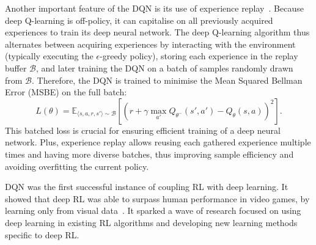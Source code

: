 Another important feature of the DQN is its use of experience replay~\citep{Lin1992_ExperienceReplay}. Because deep Q-learning is off-policy, it can capitalise on all previously acquired experiences to train its deep neural network. The deep Q-learning algorithm thus alternates between acquiring experiences by interacting with the environment (typically executing the $\epsilon$-greedy policy), storing each experience in the replay buffer $\mathcal{B}$, and later training the DQN on a batch of samples randomly drawn from $\mathcal{B}$. Therefore, the DQN is trained to minimise the Mean Squared Bellman Error (MSBE) on the full batch:
\begin{equation}
    L(\theta)=\mathbb{E}_{\langle s,a,r,s'\rangle\sim\mathcal{B}}\left[\left(r+\gamma\max_{a'}Q_{{\theta^-}}(s',a')-Q_\theta(s,a)\right)^2\right].
    \label{eq:DQN}
\end{equation}
This batched loss is crucial for ensuring efficient training of a deep neural network. Plus, experience replay allows reusing each gathered experience multiple times and having more diverse batches, thus improving sample efficiency and avoiding overfitting the current policy.

DQN was the first successful instance of coupling RL with deep learning. It showed that deep RL was able to surpass human performance in video games, by learning only from visual data~\citep{Mnih2013_DQN}. It sparked a wave of research focused on using deep learning in existing RL algorithms and developing new learning methods specific to deep RL. 

